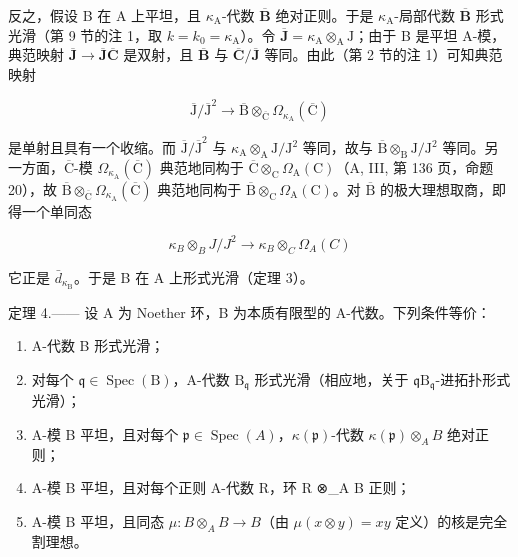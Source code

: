 反之，假设 B 在 A 上平坦，且 \(\kappa_{\mathrm{A}}\)-代数 \(\overline{\mathbf{B}}\) 绝对正则。于是 \(\kappa_{\mathrm{A}}\)-局部代数 \(\overline{\mathbf{B}}\) 形式光滑（第 9 节的注 1，取 \(k = k_0 = \kappa_{\mathrm{A}}\)）。令 \(\overline{\mathbf{J}} = \kappa_{\mathrm{A}} \otimes_{\mathrm{A}} \mathrm{J}\)；由于 B 是平坦 A-模，典范映射 \(\overline{\mathbf{J}} \to \overline{\mathbf{J}}\overline{\mathbf{C}}\) 是双射，且 \(\overline{\mathbf{B}}\) 与 \(\overline{\mathbf{C}}/\overline{\mathbf{J}}\) 等同。由此（第 2 节的注 1）可知典范映射

\[
\overline {{\mathrm{J}}} / \overline {{\mathrm{J}}} ^ {2} \longrightarrow \overline {{\mathrm{B}}} \otimes_ {\overline {{\mathrm{C}}}} \Omega_ {\kappa_ {\mathrm{A}}} (\overline {{\mathrm{C}}})
\]

是单射且具有一个收缩。而 \(\overline{\mathrm{J}}/\overline{\mathrm{J}}^{2}\) 与 \(\kappa_{\mathrm{A}}\otimes_{\mathrm{A}}\mathrm{J}/\mathrm{J}^{2}\) 等同，故与 \(\overline{\mathrm{B}}\otimes_{\mathrm{B}}\mathrm{J}/\mathrm{J}^{2}\) 等同。另一方面，\(\overline{\mathrm{C}}\)-模 \(\Omega_{\kappa_{\mathrm{A}}}(\overline{\mathrm{C}})\) 典范地同构于 \(\overline{\mathrm{C}}\otimes_{\mathrm{C}}\Omega_{\mathrm{A}}(\mathrm{C})\)（A, III, 第 136 页，命题 20），故 \(\overline{\mathrm{B}}\otimes_{\overline{\mathrm{C}}}\Omega_{\kappa_{\mathrm{A}}}(\overline{\mathrm{C}})\) 典范地同构于 \(\overline{\mathrm{B}}\otimes_{\mathrm{C}}\Omega_{\mathrm{A}}(\mathrm{C})\)。对 \(\overline{\mathrm{B}}\) 的极大理想取商，即得一个单同态

\[
\kappa_ {B} \otimes_ {B} J / J ^ {2} \longrightarrow \kappa_ {B} \otimes_ {C} \Omega_ {A} (C)
\]

它正是 \(\bar{d}_{\kappa_{\mathrm{B}}}\)。于是 B 在 A 上形式光滑（定理 3）。

定理 4.—— 设 A 为 Noether 环，B 为本质有限型的 A-代数。下列条件等价：

\begin{enumerate}
\def\labelenumi{(\roman{enumi})}
\item
  A-代数 B 形式光滑；
\item
  对每个 \(\mathfrak{q} \in \operatorname{Spec}(\mathrm{B})\)，A-代数 \(\mathrm{B}_{\mathfrak{q}}\) 形式光滑（相应地，关于 \(\mathfrak{q}\mathrm{B}_{\mathfrak{q}}\)-进拓扑形式光滑）；
\item
  A-模 B 平坦，且对每个 \(\mathfrak{p} \in \operatorname{Spec}(A)\)，\(\kappa(\mathfrak{p})\)-代数 \(\kappa(\mathfrak{p}) \otimes_{A} B\) 绝对正则；
\item
  A-模 B 平坦，且对每个正则 A-代数 R，环 R ⊗\_A B 正则；
\item
  A-模 B 平坦，且同态 \(\mu:B\otimes_{A}B\to B\)（由 \(\mu(x\otimes y)=xy\) 定义）的核是完全割理想。
\end{enumerate}

